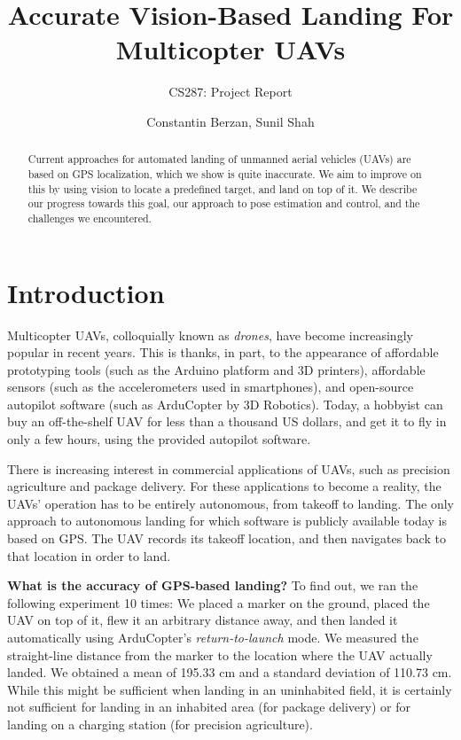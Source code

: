 \documentclass[10pt]{scrartcl} %
\title{Accurate Vision-Based Landing For Multicopter UAVs}
\subtitle{CS287: Project Report}
\author{Constantin Berzan, Sunil Shah}
\date{}
\begin{document}
\maketitle

\begin{abstract}
Current approaches for automated landing of unmanned aerial vehicles (UAVs) are
based on GPS localization, which we show is quite inaccurate. We aim to improve
on this by using vision to locate a predefined target, and land on top of it.
We describe our progress towards this goal, our approach to pose estimation and
control, and the challenges we encountered.
\end{abstract}

\section{Introduction}

Multicopter UAVs, colloquially known as \textit{drones}, have become
increasingly popular in recent years. This is thanks, in part, to the
appearance of affordable prototyping tools (such as the Arduino platform and 3D
printers), affordable sensors (such as the accelerometers used in smartphones),
and open-source autopilot software (such as ArduCopter by 3D Robotics). Today,
a hobbyist can buy an off-the-shelf UAV for less than a thousand US dollars,
and get it to fly in only a few hours, using the provided autopilot software.

There is increasing interest in commercial applications of UAVs, such as
precision agriculture and package delivery. For these applications to become a
reality, the UAVs' operation has to be entirely autonomous, from takeoff to
landing. The only approach to autonomous landing for which software is publicly
available today is based on GPS. The UAV records its takeoff location, and then
navigates back to that location in order to land.

{\bf What is the accuracy of GPS-based landing?} To find out, we ran the
following experiment 10 times: We placed a marker on the ground, placed the UAV
on top of it, flew it an arbitrary distance away, and then landed it
automatically using ArduCopter's \textit{return-to-launch} mode. We measured
the straight-line distance from the marker to the location where the UAV
actually landed. We obtained a mean of 195.33 cm and a standard deviation of
110.73 cm. While this might be sufficient when landing in an uninhabited field,
it is certainly not sufficient for landing in an inhabited area (for package
delivery) or for landing on a charging station (for precision agriculture).
\end{document}
